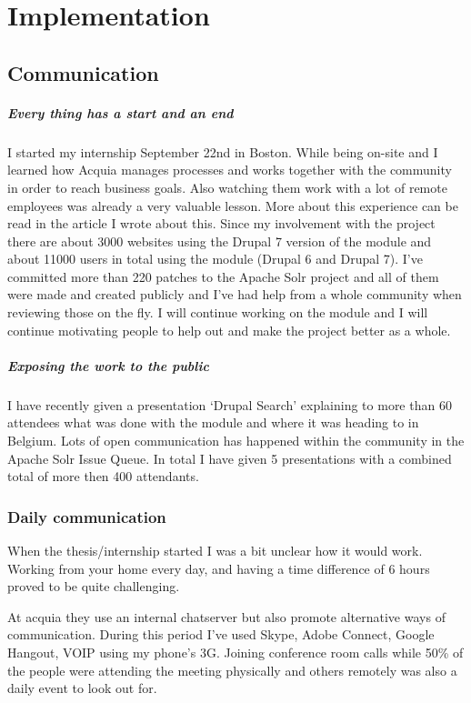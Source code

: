 \chapter{Implementation}
\section{Communication}
\paragraph{Every thing has a start and an end} I started my internship September 22nd in Boston. While being on-site and I learned how Acquia manages processes and works together with the community in order to reach business goals. Also watching them work with a lot of remote employees was already a very valuable lesson. More about this experience can be read in the article I wrote about this. Since my involvement with the project there are about 3000 websites using the Drupal 7 version of the module and about 11000 users in total using the module (Drupal 6 and Drupal 7). I've committed more than 220 patches to the Apache Solr project and all of them were made and created publicly and I've had help from a whole community when reviewing those on the fly. I will continue working on the module and I will continue motivating people to help out and make the project better as a whole. 

\paragraph{Exposing the work to the public} I have recently given a presentation ‘Drupal Search’ explaining to more than 60 attendees what was done with the module and where it was heading to in Belgium. Lots of open communication has happened within the community in the Apache Solr Issue Queue. In total I have given 5 presentations with a combined total of more then 400 attendants. 

\subsection{Daily communication}
When the thesis/internship started I was a bit unclear how it would work. Working from your home every day, and having a time difference of 6 hours proved to be quite challenging. 

At acquia they use an internal chatserver but also promote alternative ways of communication. During this period I've used Skype, Adobe Connect, Google Hangout, VOIP using my phone's 3G. Joining conference room calls while 50\% of the people were attending the meeting physically and others remotely was also a daily event to look out for.

